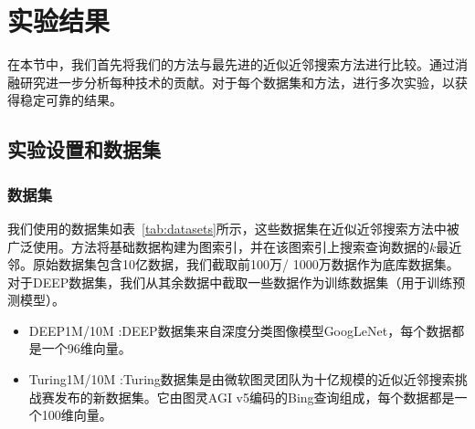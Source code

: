 \section{实验结果}\label{sec:galg-experiment}
在本节中，我们首先将我们的方法与最先进的近似近邻搜索方法进行比较。通过消融研究进一步分析每种技术的贡献。对于每个数据集和方法，进行多次实验，以获得稳定可靠的结果。

\subsection{实验设置和数据集}
\subsubsection{数据集}
我们使用的数据集如表~\ref{tab:datasets}所示，这些数据集在近似近邻搜索方法中被广泛使用。\ganns 方法将基础数据构建为图索引，并在该图索引上搜索查询数据的$k$最近邻。原始数据集包含10亿数据，我们截取前100万/ 1000万数据作为底库数据集。对于DEEP数据集，我们从其余数据中截取一些数据作为训练数据集（用于训练预测模型）。
\begin{itemize}
    \item DEEP1M/10M \cite{deep-2016}:DEEP数据集来自深度分类图像模型GoogLeNet，每个数据都是一个96维向量。
    \item Turing1M/10M \cite{billionanns}:Turing数据集是由微软图灵团队为十亿规模的近似近邻搜索挑战赛发布的新数据集。它由图灵AGI v5编码的Bing查询组成，每个数据都是一个100维向量。
\end{itemize}

